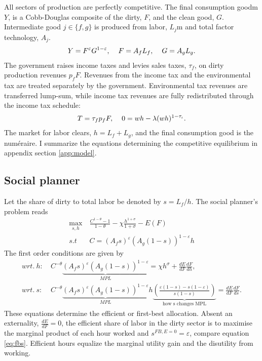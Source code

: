 All sectors of production are perfectly competitive. The final consumption goodm $Y$, is a Cobb-Douglas composite of the dirty, $F$, and the clean good, $G$. Intermediate good $j\in \{f,g\}$ is produced from labor, $L_j$m and total factor technology, $A_j$. 
\begin{align}
Y=F^{\varepsilon}G^{1-
	\varepsilon}, \hspace{4mm}
F=A_fL_f, \hspace{4mm}
G=A_gL_g.
\end{align}
The government raises income taxes and levies sales taxes, $\tau_f$, on dirty production revenues $p_fF$. Revenues from the income tax and the environmental tax are treated separately by the government. Environmental tax revenues are transferred lump-sum, while income tax revenues are fully redistributed through the income tax schedule:
\begin{align}
T=\tau_{f}p_fF, \hspace{4mm}
0={w h}-\lambda(w h)^{1-\tau_{\iota}}.
\end{align}
The market for labor clears, $h=L_f+L_g$, and the final consumption good is the numéraire.
I summarize the equations determining the competitive equilibrium in appendix section \ref{app:model}.

\subsection{Social planner}
Let the share of dirty to total labor be denoted by $s=L_f/h$. The social planner's problem reads
\begin{align}
\underset{s, h}{\max}\ & \frac{C^{1-\theta}-1}{1-\theta}-\chi \frac{h^{1+\sigma}}{1+\sigma}-E(F)\\
s.t\ \ & C=\left(A_fs\right)^{\varepsilon}\left(A_g(1-s)\right)^{1-\varepsilon}h
\end{align}
The first order conditions are given by
\begin{align}
wrt.\ h:\ & C^{-\theta}\underbrace{(A_fs)^{\varepsilon}(A_g(1-s))^{1-\varepsilon}}_{MPL}=\chi h^\sigma+\frac{dE}{dF}\frac{dF}{dh}\label{eq:fbh},\\
wrt.\ s:\ & C^{-\theta}\underbrace{(A_fs)^{\varepsilon}(A_g(1-s))^{1-\varepsilon}}_{MPL}h\underbrace{\left(\frac{\varepsilon(1-s)-s(1-\varepsilon)}{s(1-s)}\right)}_{\text{how s changes MPL}}=\frac{dE}{dF}\frac{dF}{ds}. \label{eq:fbs}
\end{align}
These equations determine the efficient or first-best allocation. 
Absent an externality, $\frac{dE}{dF}=0$, the efficient share of labor in the dirty sector is to maximise the marginal product of each hour worked and $s^{FB,E=0}=\varepsilon$, compare equation \ref{eq:fbs}. Efficient hours equalize the marginal utility gain and the disutility from working. 

